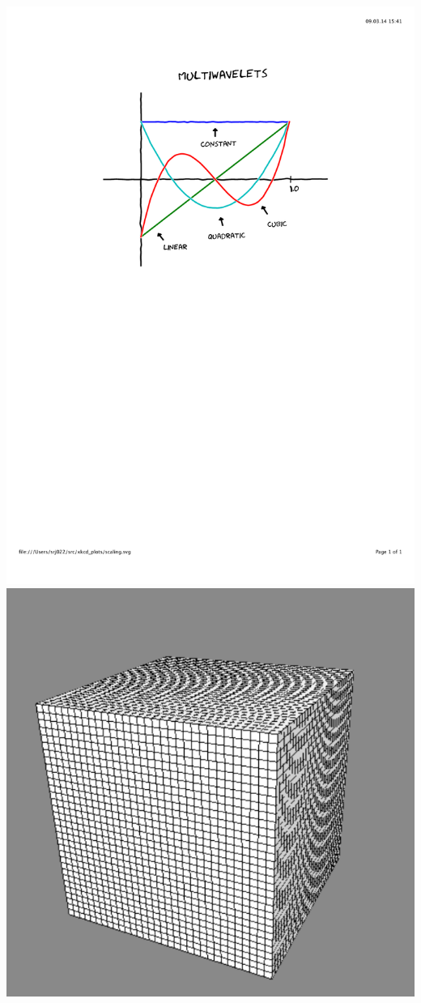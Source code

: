 \documentclass[mathserif, 10pt]{beamer}
\begin{document}
\begin{frame}
\begin{columns}
    \begin{column}[b]{0.6\linewidth}
	\centering
	\includegraphics[scale=0.3, clip, viewport = 100 400 500 800]{figures/scaling.pdf}\\
	\includegraphics[scale=0.2]{figures/unifgrid.pdf}

\end{column}
\end{columns}
\end{frame}
\end{document}
